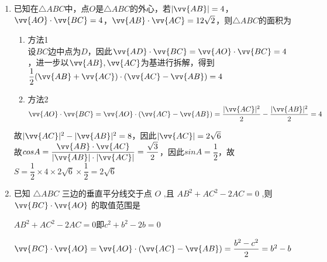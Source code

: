 \begin{enumerate}
\begin{enumerate}
        \item 已知在$\triangle{ABC}$中，点$O$是$\triangle{ABC}$的外心，若$|\vv{AB}| = 4$，$\vv{AO} \cdot \vv{BC} = 4$，$\vv{AB} \cdot \vv{AC} = 12\sqrt{2}$，则$\triangle{ABC}$的面积为
        \begin{jieda}
            \begin{enumerate}
                \item 方法1 \\
                设$BC$边中点为$D$，因此$\vv{AD} \cdot \vv{BC} = \vv{AO} \cdot \vv{BC} = 4$，进一步以$\vv{AB}, \vv{AC}$为基进行拆解，得到$\dfrac{1}{2}(\vv{AB}+\vv{AC}) \cdot (\vv{AC} - \vv{AB}) = 4$
                \item 方法2 \\
                $\vv{AO} \cdot \vv{BC} = \vv{AO} \cdot (\vv{AC} - \vv{AB}) = \dfrac{|\vv{AC}|^2}{2} - \dfrac{|\vv{AB}|^2}{2} = 4$
            \end{enumerate}
            故$|\vv{AC}|^2 - |\vv{AB}|^2 = 8$，因此$|\vv{AC}| = 2\sqrt{6}$\\
            故$cosA = \dfrac{\vv{AB} \cdot \vv{AC}}{|\vv{AB}| \cdot |\vv{AC}|} = \dfrac{\sqrt{3}}{2}$，因此$sinA = \dfrac{1}{2}$，故$S = \dfrac{1}{2} \times 4 \times 2\sqrt{6} \times \dfrac{1}{2} = 2\sqrt{6}$
        \end{jieda}
        \item 已知 $\bigtriangleup  {ABC}$ 三边的垂直平分线交于点 $O$ ,且 $A{B}^{2} + A{C}^{2} - {2AC} = 0$ ,则 $\vv{BC} \cdot  \vv{AO}$ 的取值范围是\blkda{$\left[ -\dfrac{1}{4},2\right)$}
        \begin{jieda}
            $A{B}^{2} + A{C}^{2} - {2AC} = 0$即$c^2+b^2-2b = 0$

            $\vv{BC} \cdot  \vv{AO} = \vv{AO} \cdot (\vv{AC} - \vv{AB}) = \dfrac{b^2 - c^2}{2} = b^2 - b$


\end{jieda}
\end{enumerate}
\end{enumerate}
